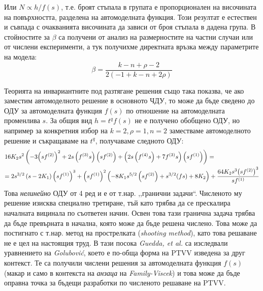 Или $N \propto h/f(s)$, т.е. броят стъпала в групата е пропорционален на височината на повърхността, разделена на автомоделната функция. Този резултат е естествен и съвпада с очакванията височината да зависи от броя стъпала в дадена група. В \cite{Kozlov2022} стойностите за $\beta$ са получени от анализ на размерностите на частни случаи или от числени експерименти, а тук получихме директната връзка между параметрите на модела:
\begin{equation}
    \beta = \frac{{k - n + \rho  - 2}}{{2\left( { - 1 + k - n + 2\rho } \right)}}
    \label{eq:beta_explicit}
\end{equation}

Теорията на инвариантните под разтягане решения също така показва, че ако заместим автомоделното решение в основното ЧДУ, то може да бъде сведено до ОДУ за автомоделната функция $f(s)$ по отношение на автомоделната променлива $s$. За общия вид $h  = t^q f(s)$ не е получено обобщено ОДУ, но например за конкретния избор на  $k = 2, \rho  = 1, n = 2$ заместваме автомоделното решение и съкращаваме на $t^q$, получаваме следното ОДУ:
\[\begin{gathered}
  16{K_2}{s^2}\left( { - 3{{\left( {s{f^{(2)}}} \right)}^2} + 2s\left( {{f^{(3)}}s} \right)\left( {s{f^{(2)}}} \right) + \left( {2s\left( {{f^{(4)}}s} \right) + 7{f^{(3)}}s} \right)\left( {s{f^{(1)}}} \right)} \right) =  \hfill \\
   = 2{s^{3/2}}\left( {s - 2{K_1}} \right){\left( {s{f^{(1)}}} \right)^3} + {\left( {s{f^{(1)}}} \right)^2}\left( { - 8{K_1}{s^{5/2}}\left( {s{f^{(2)}}} \right) + {s^{3/2}}(fs) + 8{K_2}} \right) + \frac{{64{K_2}{s^3}{{\left( {s{f^{(2)}}} \right)}^3}}}{{s{f^{(1)}}}} \hfill \\ 
\end{gathered} \]
Това \textit{нелинейно} ОДУ от 4 ред и е от т.нар. ,,гранични задачи``. Численото му решение изисква специално третиране, тъй като трябва да се прескалира началната вицинала по съответен начин. Освен това тази гранична задача трябва да бъде превърната в начална, която може да бъде решена числено. Това може да постигнато с т.нар. метод на прострелката (\textit{shooting method}), като това решаване не е цел на настоящия труд. В тази посока \textit{Guedda, et al.} \cite{Guedda2022} са изследвали уравнението на \textit{Golubović}, което е по-обща форма на PTVV изведена за друг контекст. Те са получили числени решения за автомоделната функция $f(s)$ (макар и само в контекста на \textit{анзаца} на \textit{Family-Viscek}) и това може да бъде оправна точка за бъдещи разработки по численото решаване на PTVV.